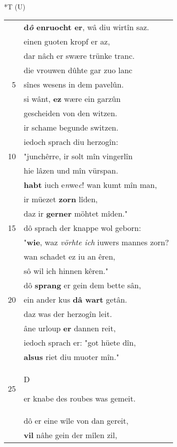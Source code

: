 \documentclass[8pt,a4paper,notitlepage]{article}
\begin{document}
\begin{table}[ht]
\hspace{0.5cm}
\begin{minipage}[t]{0.5\linewidth}
\small
\begin{center}*T (U)
\end{center}
\begin{tabular}{rl}
 & \textbf{d\textit{ô} enruocht er}, wâ diu wirtîn saz.\\ 
 & einen guoten kropf er az,\\ 
 & dar nâch er swære trünke tranc.\\ 
 & die vrouwen dûhte gar zuo lanc\\ 
5 & sînes wesens in dem pavelûn.\\ 
 & si wânt, \textbf{ez} wære ein garzûn\\ 
 & gescheiden von den witzen.\\ 
 & ir schame begunde switzen.\\ 
 & iedoch sprach diu herzogîn:\\ 
10 & "junchêrre, ir solt mîn vingerlîn\\ 
 & hie lâzen und mîn vürspan.\\ 
 & \textbf{habt} iuch e\textit{n}we\textit{c}! wan kumt mîn man,\\ 
 & ir müezet \textbf{zorn} lîden,\\ 
 & daz ir \textbf{gerner} möhtet mîden."\\ 
15 & dô sprach der knappe wol geborn:\\ 
 & "\textbf{wie}, waz \textit{vörhte ich} iuwers mannes zorn?\\ 
 & wan schadet ez iu an êren,\\ 
 & sô wil ich hinnen kêren."\\ 
 & dô \textbf{sprang} er gein dem bette sân,\\ 
20 & ein ander kus \textbf{dâ wart} getân.\\ 
 & daz was der herzogîn leit.\\ 
 & âne urloup \textbf{er} dannen reit,\\ 
 & iedoch sprach er: "got hüete dîn,\\ 
 & \textbf{alsus} riet diu muoter mîn."\\ 
25 & \begin{large}D\end{large}er knabe des roubes was gemeit.\\ 
 & dô er eine wîle von dan gereit,\\ 
 & \textbf{vil} nâhe gein der mîlen zil,\\ 

\end{tabular}
\end{minipage}
\end{table}
\end{document}
